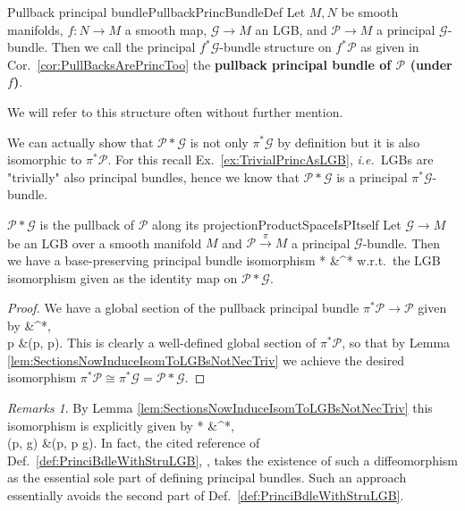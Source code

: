 \documentclass[a4paper,oneside,11pt,bibliography=totoc]{scrartcl}
\def\bas#1\eas{\begin{align*}#1\end{align*}}
\theoremstyle{plain}
\theoremstyle{remark}
\newtheorem{remark}[theorem]{Remarks}
\theoremstyle{definition}
\begin{document}
\begin{definitions}{Pullback principal bundle}{PullbackPrincBundleDef}
Let $M, N$ be smooth manifolds, $f: N \to M$ a smooth map, $\mathcal{G} \to M$ an LGB, and $\mathcal{P} \to M$ a principal $\mathcal{G}$-bundle. Then we call the principal $f^*\mathcal{G}$-bundle structure on $f^*\mathcal{P}$ as given in Cor.\ \ref{cor:PullBacksArePrincToo} the \textbf{pullback principal bundle of $\mathcal{P}$ (under $f$)}.

We will refer to this structure often without further mention.
\end{definitions}

We can actually show that $\mathcal{P}*\mathcal{G}$ is not only $\pi^*\mathcal{G}$ by definition but it is also isomorphic to $\pi^*\mathcal{P}$. For this recall Ex.\ \ref{ex:TrivialPrincAsLGB}, \textit{i.e.}\ LGBs are "trivially" also principal bundles, hence we know that $\mathcal{P} * \mathcal{G}$ is a principal $\pi^*\mathcal{G}$-bundle.

\begin{corollaries}{$\mathcal{P}*\mathcal{G}$ is the pullback of $\mathcal{P}$ along its projection}{ProductSpaceIsPItself}
Let $\mathcal{G} \to M$ be an LGB over a smooth manifold $M$ and $\mathcal{P} \stackrel{\pi}{\to} M$ a principal $\mathcal{G}$-bundle. Then we have a base-preserving principal bundle isomorphism 
\bas
\mathcal{P}* &\cong \pi^*
\eas
w.r.t.\ the LGB isomorphism given as the identity map on $\mathcal{P} * \mathcal{G}$.
\end{corollaries}

\begin{proof}
\leavevmode\newline
We have a global section of the pullback principal bundle $\pi^*\mathcal{P} \to \mathcal{P}$ given by
\bas
\mathcal{P} &\to \pi^*,\\
p &\mapsto (p, p).
\eas
This is clearly a well-defined global section of $\pi^*\mathcal{P}$, so that by Lemma \ref{lem:SectionsNowInduceIsomToLGBsNotNecTriv} we achieve the desired isomorphism $\pi^*\mathcal{P} \cong \pi^*\mathcal{G} = \mathcal{P} * \mathcal{G}$.
\end{proof}

\begin{remark}\label{AlternativePrincBdlDef}
\leavevmode\newline
By Lemma \ref{lem:SectionsNowInduceIsomToLGBsNotNecTriv} this isomorphism is explicitly given by
\bas
\mathcal{P}* &\to \pi^*,\\
(p, g) &\mapsto (p, p \cdot g).
\eas
In fact, the cited reference of Def.\ \ref{def:PrinciBdleWithStruLGB}, \cite[simplification of the beginning of \S 5.7, page 144f.]{GroupoidBasedPrincipalBundles}, takes the existence of such a diffeomorphism as the essential sole part of defining principal bundles. Such an approach essentially avoids the second part of Def.\ \ref{def:PrinciBdleWithStruLGB}.
\end{remark}
\end{document}

